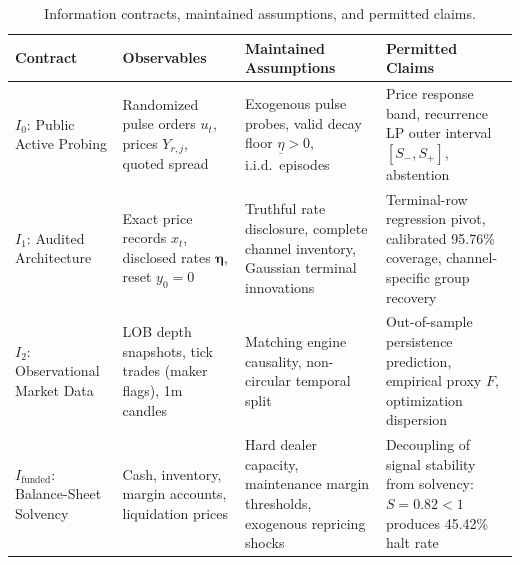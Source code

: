 \begin{table}[htbp]
\centering\small
\caption{Information contracts, maintained assumptions, and permitted claims.}
\label{tab:T1_contracts}
\begin{tabularx}{\textwidth}{p{}p{}p{}Y}
\toprule
Contract & Observables & Maintained Assumptions & Permitted Claims \\
\midrule
$I_0$: Public Active Probing & Randomized pulse orders $u_t$, prices $Y_{r,j}$, quoted spread & Exogenous pulse probes, valid decay floor $\underline\eta > 0$, i.i.d.\ episodes & Price response band, recurrence LP outer interval $[S_-, S_+]$, abstention \\
\midrule
$I_1$: Audited Architecture & Exact price records $x_t$, disclosed rates $\boldsymbol\eta$, reset $y_0=0$ & Truthful rate disclosure, complete channel inventory, Gaussian terminal innovations & Terminal-row regression pivot, calibrated 95.76\% coverage, channel-specific group recovery \\
\midrule
$I_2$: Observational Market Data & LOB depth snapshots, tick trades (maker flags), 1m candles & Matching engine causality, non-circular temporal split & Out-of-sample persistence prediction, empirical proxy $F$, optimization dispersion \\
\midrule
$I_{\mathrm{funded}}$: Balance-Sheet Solvency & Cash, inventory, margin accounts, liquidation prices & Hard dealer capacity, maintenance margin thresholds, exogenous repricing shocks & Decoupling of signal stability from solvency: $S=0.82 < 1$ produces 45.42\% halt rate \\
\bottomrule
\end{tabularx}
\end{table}
